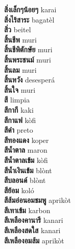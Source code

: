 \textbf{ สิ่งเล็กๆน้อยๆ  } karai \\
\textbf{ สิ่งไร้สาระ  } bagatèl \\
\textbf{ สิ่ว  } beitel \\
\textbf{ สิ้นชีพ  } muri \\
\textbf{ สิ้นชีพิตักษัย  } muri \\
\textbf{ สิ้นพระชนม์  } muri \\
\textbf{ สิ้นลม  } muri \\
\textbf{ สิ้นหวัง  } desesperá \\
\textbf{ สิ้นใจ  } muri \\
\textbf{ สี  } limpia \\
\textbf{ สีกากี  } kaki \\
\textbf{ สีกาแฟ  } kòfi \\
\textbf{ สีดำ  } preto \\
\textbf{ สีทองแดง  } koper \\
\textbf{ สีน้ำตาล  } maron \\
\textbf{ สีน้ำตาลเข้ม  } kòfi \\
\textbf{ สีน้ำเงินเข้ม  } blònt \\
\textbf{ สีบลอนด์  } blònt \\
\textbf{ สีย้อม  } koló \\
\textbf{ สีส้มอ่อนอมชมพู  } aprikòt \\
\textbf{ สีเทาเข้ม  } karbon \\
\textbf{ สีเหลืองคานารี  } kanari \\
\textbf{ สีเหลืองสดใส  } kanari \\
\textbf{ สีเหลืองอมส้ม  } aprikòt \\
